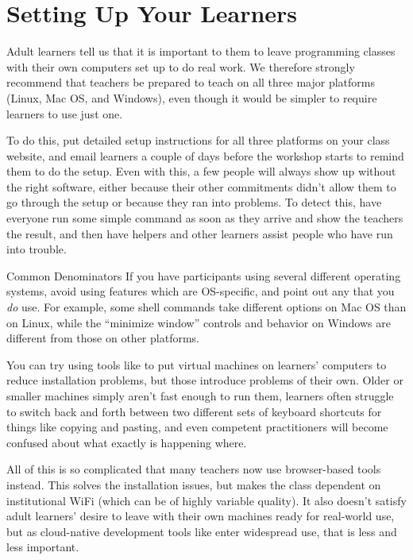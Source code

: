 \section{Setting Up Your Learners}\label{s:classroom-setup}

Adult learners tell us that it is important to them to leave programming
classes with their own computers set up to do real work. We therefore
strongly recommend that teachers be prepared to teach on all three major
platforms (Linux, Mac OS, and Windows), even though it would be simpler
to require learners to use just one.

To do this, put detailed setup instructions for all three platforms on
your class website, and email learners a couple of days before the
workshop starts to remind them to do the setup. Even with this, a few
people will always show up without the right software, either because
their other commitments didn't allow them to go through the setup or
because they ran into problems. To detect this, have everyone run some
simple command as soon as they arrive and show the teachers the result,
and then have helpers and other learners assist people who have run into
trouble.

\begin{aside}{Common Denominators}
  If you have participants using several different operating systems,
  avoid using features which are OS-specific, and point out any that you
  \emph{do} use. For example, some shell commands take different options on
  Mac OS than on Linux, while the ``minimize window'' controls and
  behavior on Windows are different from those on other platforms.
\end{aside}

You can try using tools like  to put virtual machines
on learners' computers to reduce installation problems, but those
introduce problems of their own. Older or smaller machines simply
aren't fast enough to run them, learners often struggle to switch back
and forth between two different sets of keyboard shortcuts for things
like copying and pasting, and even competent practitioners will become
confused about what exactly is happening where.

All of this is so complicated that many teachers now use browser-based
tools instead. This solves the installation issues, but makes the
class dependent on institutional WiFi (which can be of highly variable
quality). It also doesn't satisfy adult learners' desire to leave with
their own machines ready for real-world use, but as cloud-native
development tools like  enter widespread use, that is
less and less important.

